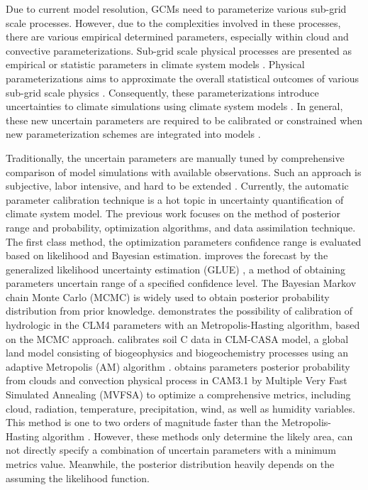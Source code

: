 \documentclass[gmd, manuscript]{copernicus}
\begin{document}
Due to current model resolution, GCMs need to parameterize various sub-grid scale processes. However, due to the complexities involved in these processes, there are various empirical determined parameters, especially within cloud and convective parameterizations. Sub-grid scale physical processes are presented as empirical or statistic parameters in climate system models \citep{hack1994climate}. Physical parameterizations aims to approximate the overall statistical outcomes of various sub-grid scale physics \citep{williams2005modelling}. Consequently, these parameterizations introduce uncertainties  to climate simulations using climate system models \citep{warren1979seasonal}. In general, these new uncertain parameters are required to be calibrated or constrained when new parameterization schemes are integrated into models \citep{li2013evaluation}.


Traditionally, the uncertain parameters are manually tuned by comprehensive comparison of model simulations with available observations. Such an approach is subjective, labor intensive, and hard to be extended \citep{hakkarainen2012closure, allen2000quantifying}. Currently, the automatic parameter calibration technique is a hot topic in uncertainty quantification of climate system model. The previous work focuses on the method of posterior range and probability, optimization algorithms, and data assimilation technique. The first class method, the optimization parameters confidence range is evaluated based on likelihood and Bayesian estimation. \cite{cameron1999flood} improves the forecast by the generalized likelihood uncertainty estimation (GLUE) \citep{beven1992future}, a method of obtaining parameters uncertain range of a specified confidence level. The Bayesian Markov chain Monte Carlo (MCMC) \citep{gilks2005markov} is widely used to obtain posterior probability distribution from prior knowledge. \cite{sun2013inverse} demonstrates the possibility of calibration of hydrologic in the CLM4  parameters with an Metropolis-Hasting algorithm, based on the MCMC approach. \cite{hararuk2014evaluation} calibrates soil C data in CLM-CASA model, a global land model consisting of biogeophysics and biogeochemistry processes using an adaptive Metropolis (AM) algorithm \citep{gilks2005markov}. \cite{jackson2008error} obtains parameters posterior probability  from clouds and convection physical process in CAM3.1 by Multiple Very Fast Simulated Annealing (MVFSA) to optimize a comprehensive metrics, including  cloud, radiation, temperature, precipitation, wind, as  well as humidity variables. This method is one to two orders of magnitude faster than the Metropolis-Hasting algorithm \citep{jackson2004efficient}. However, these methods only determine the likely area, can not directly specify a combination of uncertain parameters with a minimum metrics value. Meanwhile, the posterior distribution heavily depends on  the assuming the likelihood function.
\end{document}
